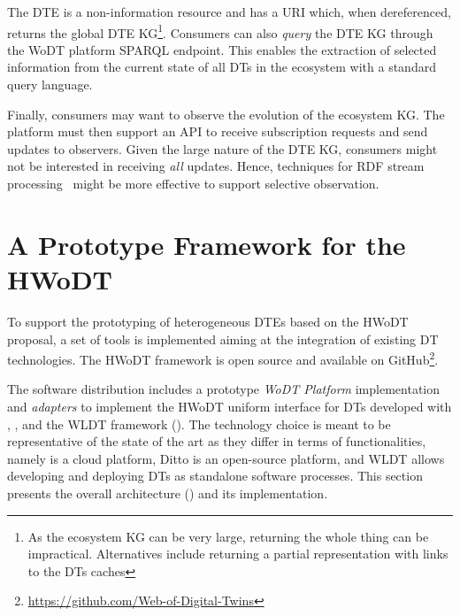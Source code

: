 The \ac{DTE} is a non-information resource and has a \ac{URI} which, when dereferenced, returns the global \ac{DTE} \ac{KG}\footnote{As the ecosystem \ac{KG} can be very large, returning the whole thing can be impractical. Alternatives include returning a partial representation with links to the \acp{DT} caches}.
%
Consumers can also \emph{query} the \ac{DTE} \ac{KG} through the \ac{WoDT} platform SPARQL endpoint.
%
This enables the extraction of selected information from the current state of all \acp{DT} in the ecosystem with a standard query language.

Finally, consumers may want to observe the evolution of the ecosystem \ac{KG}. The platform must then support an \ac{API} to receive subscription requests and send updates to observers.
%
Given the large nature of the \ac{DTE} \ac{KG}, consumers might not be interested in receiving \emph{all} updates. Hence, techniques for \ac{RDF} stream processing~\cite{barbieri2009www} might be more effective to support selective observation.

\section{A Prototype Framework for the HWoDT}
\label{sec:hwodt-impl}

To support the prototyping of heterogeneous \acp{DTE} based on the \ac{HWoDT} proposal, a set of tools is implemented aiming at the integration of existing \ac{DT} technologies.
%
The HWoDT framework is open source and available on GitHub\footnote{\url{https://github.com/Web-of-Digital-Twins}}. 

The software distribution includes a prototype \emph{\ac{WoDT} Platform} implementation and \emph{adapters} to implement the \ac{HWoDT} uniform interface for \acp{DT} developed with \azureTwin{}, \ditto{}, and the \ac{WLDT} framework ().
%
The technology choice is meant to be representative of the state of the art as they differ in terms of functionalities, namely \azureTwin{} is a cloud platform, Ditto is an open-source platform, and \ac{WLDT} allows developing and deploying \acp{DT} as standalone software processes.
This section presents the overall architecture () and its implementation.


